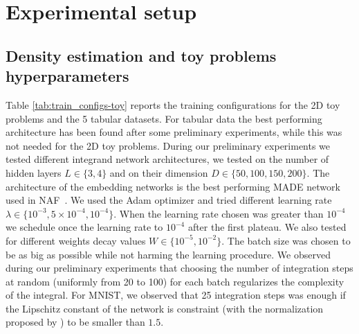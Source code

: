 \appendix
\section{Experimental setup}

\subsection{Density estimation and toy problems hyperparameters}\label{app:config-toy}
Table \ref{tab:train_configs-toy} reports the training configurations for  the 2D toy problems and the 5 tabular datasets. 
For tabular data the best performing architecture has been found after some preliminary experiments, while this was not needed for the 2D toy problems. During our preliminary experiments we tested different integrand network architectures, we tested on the number of hidden layers $L \in \{3, 4\}$ and on their dimension $D \in \{50, 100, 150, 200\}$. The architecture of the embedding networks is the best performing MADE network used in NAF~\citep{NAF}. We used the Adam optimizer and tried different learning rate $\lambda \in \{10^{-3}, 5\times 10^{-4}, 10^{-4}\}$. When the learning rate chosen was greater than $10^{-4}$ we schedule once the learning rate to $10^{-4}$ after the first plateau. We also tested for different weights decay values $W \in \{10^{-5}, 10^{-2}\}$. The batch size was chosen to be as big as possible while not harming the learning procedure. We observed during our preliminary experiments that choosing the number of integration steps at random (uniformly from 20 to 100) for each batch regularizes the complexity of the integral. For MNIST, we observed that 25 integration steps was enough if the Lipschitz constant of the network is constraint (with the normalization proposed by \cite{L_regularisation}) to be smaller than $1.5$.

